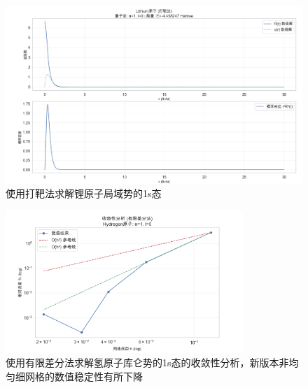\begin{figure}[H]
    \centering
    \includegraphics[width=1.0\textwidth]{Problem_2/figs/example_li_shooting_1s.png}
    \caption{使用打靶法求解锂原子局域势的1s态}
\end{figure}

\begin{figure}[H]
    \centering
    \includegraphics[width=0.8\textwidth]{Problem_2/figs/example_h_fd_1s_con.png}
    \caption{使用有限差分法求解氢原子库仑势的1s态的收敛性分析，新版本非均匀细网格的数值稳定性有所下降}
\end{figure}

